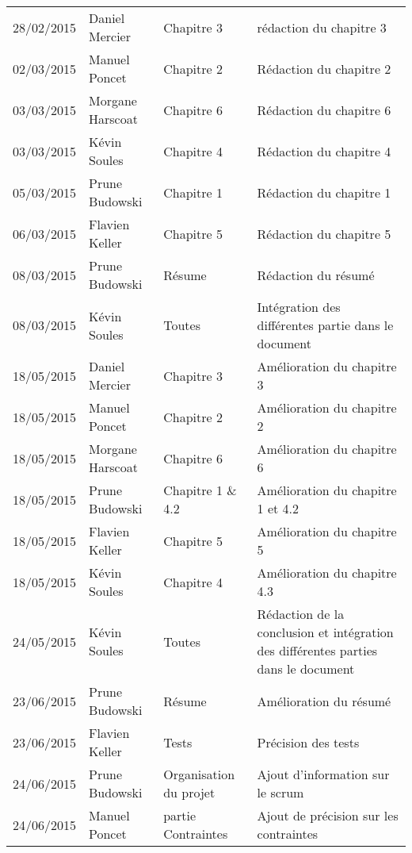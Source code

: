 \small
\begin{tabular}{|p{1.9cm}| >{\raggedright}p{2.5cm}|p{2.5cm}|p{8.5cm}|}
  \hline
  \rowcolor{Gainsboro} \color{Navy}{\bfseries Date}  & \color{Navy}{\bfseries Auteur} & \color{Navy}{\bfseries Section(s)}  &\color{Navy}{\bfseries Commentaires} \\
  \hline
  28/02/2015 & Daniel Mercier & Chapitre 3 & rédaction du chapitre 3\\
  \hline
  02/03/2015 & Manuel Poncet & Chapitre 2 & Rédaction du chapitre 2\\
  \hline
  03/03/2015 & Morgane Harscoat & Chapitre 6 & Rédaction du chapitre 6\\
  \hline
  03/03/2015 & Kévin Soules & Chapitre 4 & Rédaction du chapitre 4\\
  \hline
  05/03/2015 & Prune Budowski & Chapitre 1 & Rédaction du chapitre 1\\
  \hline
  06/03/2015 & Flavien Keller & Chapitre 5 & Rédaction du chapitre 5\\
  \hline
  08/03/2015 & Prune Budowski & Résume & Rédaction du résumé\\
  \hline
  08/03/2015 & Kévin Soules & Toutes & Intégration des différentes partie dans le document\\
  \hline
  18/05/2015 & Daniel Mercier & Chapitre 3 & Amélioration du chapitre 3\\
  \hline
  18/05/2015 & Manuel Poncet & Chapitre 2 & Amélioration du chapitre 2\\
  \hline
  18/05/2015 & Morgane Harscoat & Chapitre 6 & Amélioration du chapitre 6\\
  \hline
  18/05/2015 & Prune Budowski & Chapitre 1 \& 4.2 & Amélioration du chapitre 1 et 4.2\\
  \hline
  18/05/2015 & Flavien Keller & Chapitre 5 & Amélioration du chapitre 5\\
  \hline
  18/05/2015 & Kévin Soules & Chapitre 4 & Amélioration du chapitre 4.3\\
  \hline
  24/05/2015 & Kévin Soules & Toutes & Rédaction de la conclusion et intégration des différentes parties dans le document\\
  \hline
  23/06/2015 & Prune Budowski & Résume & Amélioration du résumé\\
  \hline
  23/06/2015 & Flavien Keller & Tests & Précision des tests\\
  \hline
  24/06/2015 & Prune Budowski & Organisation du projet & Ajout d'information sur le scrum\\
  \hline
  24/06/2015 & Manuel Poncet & partie Contraintes & Ajout de précision sur les contraintes\\
  \hline
\end{tabular}
\normalsize
